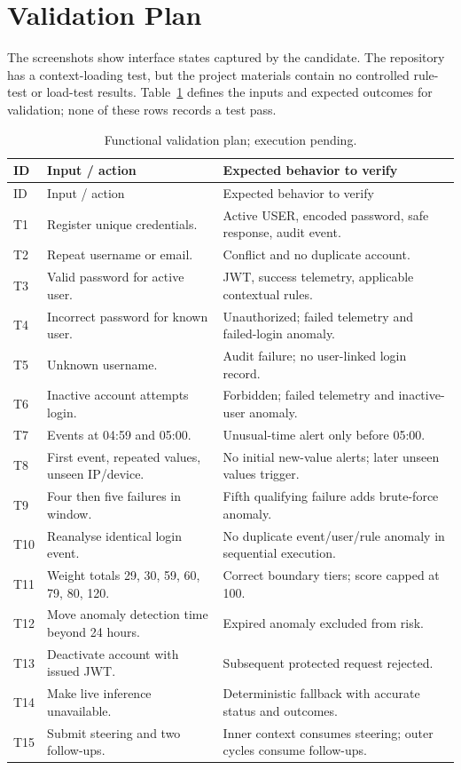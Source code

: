 \clearpage\section{Validation Plan}
The screenshots show interface states captured by the candidate. The repository has a context-loading test, but the project materials contain no controlled rule-test or load-test results. Table~\ref{tab:tests} defines the inputs and expected outcomes for validation; none of these rows records a test pass.
\begingroup\footnotesize{}\renewcommand{\arraystretch}{1.1}\setlength{\parskip}{0pt}
\begin{longtable}{>{\raggedright\arraybackslash}p{0.9cm}>{\raggedright\arraybackslash}p{6.1cm}>{\raggedright\arraybackslash}p{7cm}}
\caption{Functional validation plan; execution pending.}\label{tab:tests}\\\toprule ID & Input / action & Expected behavior to verify\\\midrule\endfirsthead
\toprule ID & Input / action & Expected behavior to verify\\\midrule\endhead
T1 & Register unique credentials. & Active USER, encoded password, safe response, audit event.\\
T2 & Repeat username or email. & Conflict and no duplicate account.\\
T3 & Valid password for active user. & JWT, success telemetry, applicable contextual rules.\\
T4 & Incorrect password for known user. & Unauthorized; failed telemetry and failed-login anomaly.\\
T5 & Unknown username. & Audit failure; no user-linked login record.\\
T6 & Inactive account attempts login. & Forbidden; failed telemetry and inactive-user anomaly.\\
T7 & Events at 04:59 and 05:00. & Unusual-time alert only before 05:00.\\
T8 & First event, repeated values, unseen IP/device. & No initial new-value alerts; later unseen values trigger.\\
T9 & Four then five failures in window. & Fifth qualifying failure adds brute-force anomaly.\\
T10 & Reanalyse identical login event. & No duplicate event/user/rule anomaly in sequential execution.\\
T11 & Weight totals 29, 30, 59, 60, 79, 80, 120. & Correct boundary tiers; score capped at 100.\\
T12 & Move anomaly detection time beyond 24 hours. & Expired anomaly excluded from risk.\\
T13 & Deactivate account with issued JWT. & Subsequent protected request rejected.\\
T14 & Make live inference unavailable. & Deterministic fallback with accurate status and outcomes.\\
T15 & Submit steering and two follow-ups. & Inner context consumes steering; outer cycles consume follow-ups.\\\bottomrule
\end{longtable}
\endgroup


